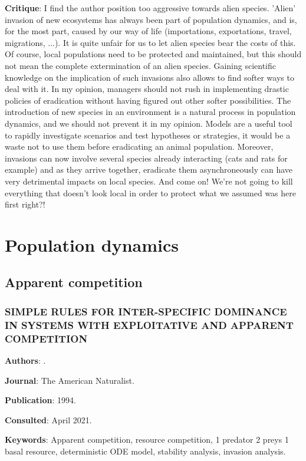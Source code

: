 \documentclass[12pt,a4paper]{article}
\begin{document}
\textbf{Critique}: I find the author position too aggressive towards alien species. 'Alien' invasion of new ecosystems has always been part of population dynamics, and is, for the most part, caused by our way of life (importations, exportations, travel, migrations, ...). It is quite unfair for us to let alien species bear the costs of this. Of course, local populations need to be protected and maintained, but this should not mean the complete extermination of an alien species. Gaining scientific knowledge on the implication of such invasions also allows to find softer ways to deal with it. In my opinion, managers should not rush in implementing drastic policies of eradication without having figured out other softer possibilities. The introduction of new species in an environment is a natural process in population dynamics, and we should not prevent it in my opinion. Models are a useful tool to rapidly investigate scenarios and test hypotheses or strategies, it would be a waste not to use them before eradicating an animal population. Moreover, invasions can now involve several species already interacting (cats and rats for example) and as they arrive together, eradicate them asynchroneously can have very detrimental impacts on local species. And come on! We're not going to kill everything that doesn't look local in order to protect what we assumed was here first right?!

\newpage

\section*{Population dynamics}

\subsection*{Apparent competition}

\subsubsection*{SIMPLE RULES FOR INTER-SPECIFIC DOMINANCE IN SYSTEMS WITH EXPLOITATIVE AND APPARENT COMPETITION}

\textbf{Authors}: \cite{holt1994simple}.

\textbf{Journal}: The American Naturalist.

\textbf{Publication}: 1994.

\textbf{Consulted}: April 2021.

\textbf{Keywords}: Apparent competition, resource competition, 1 predator 2 preys 1 basal resource, deterministic ODE model, stability analysis, invasion analysis.
\end{document}
